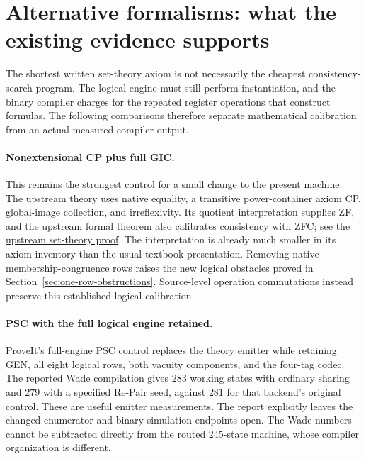 \section{Alternative formalisms: what the existing evidence supports}
\label{sec:alternative-formalisms}

The shortest written set-theory axiom is not necessarily the cheapest
consistency-search program. The logical engine must still perform
instantiation, and the binary compiler charges for the repeated register
operations that construct formulas. The following comparisons therefore
separate mathematical calibration from an actual measured compiler output.

\paragraph{Nonextensional CP plus full GIC.}
This remains the strongest control for a small change to the present
machine. The upstream theory uses native equality, a transitive
power-container axiom CP, global-image collection, and irreflexivity.
Its quotient interpretation supplies ZF, and the upstream formal theorem
also calibrates consistency with ZFC; see
\href{https://github.com/jeff87654/busy-beaver/blob/zf-254/ZF/m254/design/settheory.md}{the upstream set-theory proof}.
The interpretation is already much smaller in its axiom inventory than
the usual textbook presentation. Removing native membership-congruence
rows raises the new logical obstacles proved in
Section~\ref{sec:one-row-obstructions}. Source-level operation commutations
instead preserve this established logical calibration.

\paragraph{PSC with the full logical engine retained.}
ProveIt's
\href{https://github.com/VladimirReshetnikov/ProveIt/blob/6446ff5668307a2ac6aee1896037f0b792090389/Computability/BusyBeaver/Research/ZFC/logical_engine_completeness.md}{full-engine PSC control}
replaces the theory emitter while retaining GEN, all eight logical rows,
both vacuity components, and the four-tag codec. The reported Wade
compilation gives $283$ working states with ordinary sharing and $279$
with a specified Re-Pair seed, against $281$ for that backend's original
control. These are useful emitter measurements. The report explicitly
leaves the changed enumerator and binary simulation endpoints open.
The Wade numbers cannot be subtracted directly from the routed
$245$-state machine, whose compiler organization is different.

